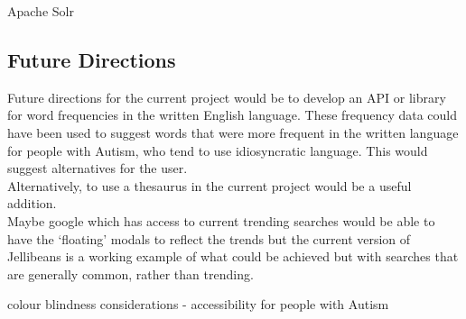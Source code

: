 \documentclass[a4paper, 11pt]{article}
\begin{document}
Apache Solr\\

\subsection{Future Directions}
Future directions for the current project would be to develop an API or library for word frequencies in the written English language. These frequency data could have been used to suggest words that were more frequent in the written language for people with Autism, who tend to use idiosyncratic language. This would suggest alternatives for the user.\\

Alternatively, to use a thesaurus in the current project would be a useful addition.\\

Maybe google which has access to current trending searches would be able to have the `floating' modals to reflect the trends but the current version of Jellibeans is a working example of what could be achieved but with searches that are generally common, rather than trending.

colour blindness considerations - accessibility for people with Autism  
\end{document}
